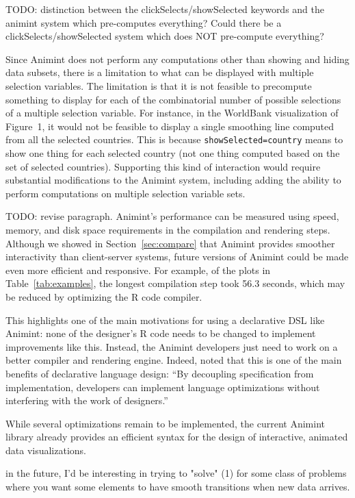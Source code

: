 \documentclass[10pt,journal,compsoc]{IEEEtran}\usepackage[]{graphicx}\usepackage[]{color}
\begin{document}
TODO: distinction between the clickSelects/showSelected keywords and
the animint system which pre-computes everything? Could there be a
clickSelects/showSelected system which does NOT pre-compute
everything?

Since Animint does not perform any computations other than showing and
hiding data subsets, there is a limitation to what can be
displayed with multiple selection variables.
The limitation is that it is not feasible to precompute
something to display for each of the combinatorial number of
possible selections
of a multiple selection variable.
For instance, in the
WorldBank visualization of Figure~1, it would not be feasible to
display a single smoothing line computed from all the selected
countries. This is because \texttt{showSelected=country} means to show
one thing for each selected country (not one thing computed based on
the set of selected countries). Supporting this kind of interaction
would require substantial modifications to the Animint system,
including adding the ability to perform computations on
multiple selection variable sets.

TODO: revise paragraph. Animint's performance can be measured using
speed, memory, and disk space requirements in the compilation and
rendering steps. Although we showed in Section~\ref{sec:compare} that
Animint provides smoother interactivity than client-server systems,
future versions of Animint could be made even more efficient and
responsive. For example, of the plots in Table~\ref{tab:examples}, the
longest compilation step took 56.3 seconds, which may be reduced by
optimizing the R code compiler.

This highlights one of the main motivations for using a declarative
DSL like Animint: none of the designer's R code needs to be changed to
implement improvements like this. Instead, the Animint developers just
need to work on a better compiler and rendering engine. Indeed,
\citet{declarative} noted that this is one of the main benefits of
declarative language design: ``By decoupling specification from
implementation, developers can implement language optimizations
without interfering with the work of designers.''

While several
optimizations remain to be implemented, the current Animint library
already provides an efficient syntax for the design of interactive,
animated data visualizations.

in the future, I'd be interesting in trying to "solve" (1) for some
class of problems where you want some elements to have smooth
transitions when new data arrives.
\end{document}
